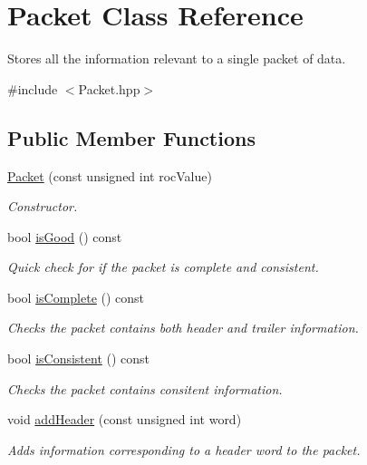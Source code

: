\hypertarget{class_packet}{}\section{Packet Class Reference}
\label{class_packet}


Stores all the information relevant to a single packet of data.  




{\ttfamily \#include $<$Packet.\+hpp$>$}

\subsection*{Public Member Functions}
\begin{DoxyCompactItemize}
\item 
\hyperlink{class_packet_a4b142794d6864d4d7949ba5e800ee1be}{Packet} (const unsigned int roc\+Value)
\begin{DoxyCompactList}\small\item\em Constructor. \end{DoxyCompactList}\item 
bool \hyperlink{class_packet_ae70511a50e1f186b8a3369ee6ab8589c}{is\+Good} () const
\begin{DoxyCompactList}\small\item\em Quick check for if the packet is complete and consistent. \end{DoxyCompactList}\item 
bool \hyperlink{class_packet_a6b5ce354c03663c98cccd31ad9a6f5ff}{is\+Complete} () const
\begin{DoxyCompactList}\small\item\em Checks the packet contains both header and trailer information. \end{DoxyCompactList}\item 
bool \hyperlink{class_packet_a8d9e544f6f56389fa13bb01b2d37ca58}{is\+Consistent} () const
\begin{DoxyCompactList}\small\item\em Checks the packet contains consitent information. \end{DoxyCompactList}\item 
void \hyperlink{class_packet_a7f710ea08bf8d264beb1361f19cc3afb}{add\+Header} (const unsigned int word)
\begin{DoxyCompactList}\small\item\em Adds information corresponding to a header word to the packet. \end{DoxyCompactList}\item 

\end{DoxyCompactItemize}
